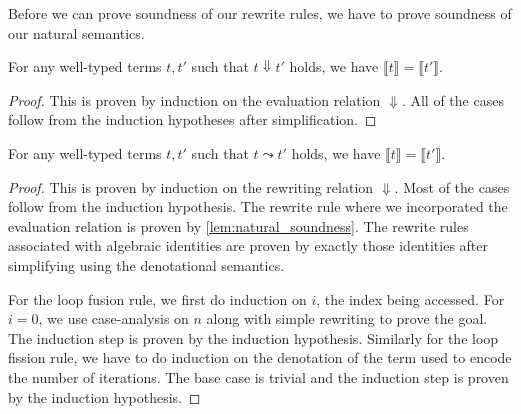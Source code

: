 Before we can prove soundness of our rewrite rules, we have to prove soundness of our natural semantics.

\begin{lemma}\label{lem:natural_soundness}
  For any well-typed terms $t, t'$ such that $t \Downarrow t'$ holds, we have $\llbracket t \rrbracket = \llbracket t' \rrbracket$.
\end{lemma}
\begin{proof}
  This is proven by induction on the evaluation relation $\Downarrow$.
  All of the cases follow from the induction hypotheses after simplification.
\end{proof}

\begin{theorem}
  For any well-typed terms $t, t'$ such that $t \leadsto t'$ holds, we have $\llbracket t \rrbracket = \llbracket t' \rrbracket$.
\end{theorem}
\begin{proof}
  This is proven by induction on the rewriting relation $\Downarrow$.
  Most of the cases follow from the induction hypothesis.
  The rewrite rule where we incorporated the evaluation relation is proven by \cref{lem:natural_soundness}.
  The rewrite rules associated with algebraic identities are proven by exactly those identities after simplifying using the denotational semantics.

  For the loop fusion rule, we first do induction on $i$, the index being accessed.
  For $i = 0$, we use case-analysis on $n$ along with simple rewriting to prove the goal. The induction step is proven by the induction hypothesis.
  Similarly for the loop fission rule, we have to do induction on the denotation of the term used to encode the number of iterations.
  The base case is trivial and the induction step is proven by the induction hypothesis.
\end{proof}